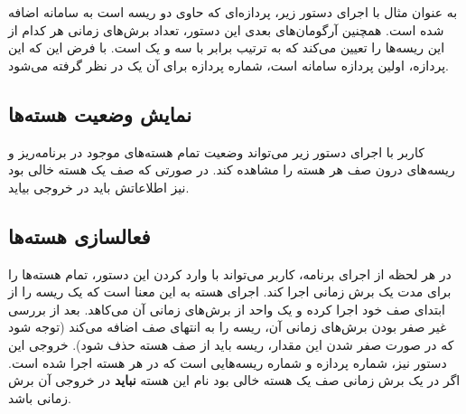\documentclass{utap}
\begin{document}
	\linespread{1.6}
	\begin{latin}%
		\centering
		\begin{minipage}[t]{1\textwidth}
			{}
			{}
		\end{minipage}%
	\end{latin}


\hspace{5mm}
به عنوان مثال با اجرای دستور زیر، پردازه‌ای که حاوی دو ریسه است به سامانه اضافه شده است. همچنین آرگومان‌های بعدی این دستور، تعداد برش‌های زمانی هر کدام از این ریسه‌ها را تعیین می‌کند که به ترتیب برابر با سه و یک است. با فرض این که این پردازه، اولین پردازه سامانه است،‌ شماره پردازه برای آن یک در نظر گرفته می‌شود.

	\linespread{1.6}
	\begin{latin}%
		\centering
		\begin{minipage}[t]{1\textwidth}
			{}
			{}
		\end{minipage}%
	\end{latin}

	\subsection{نمایش وضعیت هسته‌ها}
	\hspace{5mm}
	کاربر با اجرای دستور زیر می‌تواند وضعیت تمام هسته‌های موجود در برنامه‌ریز و ریسه‌های درون صف هر هسته را مشاهده کند. در صورتی که صف یک هسته‌ خالی بود نیز اطلاعاتش باید در خروجی بیاید.
	
	\linespread{1.6}
	\begin{latin}%
		\centering
		\begin{minipage}[t]{1\textwidth}
			{}
			{}
			{}
		\end{minipage}%
	\end{latin}

	\subsection{فعالسازی هسته‌ها}
	\hspace{5mm}
	در هر لحظه از اجرای برنامه، کاربر می‌تواند با وارد کردن این دستور، تمام هسته‌ها را برای مدت یک برش زمانی اجرا کند. اجرای هسته به این معنا است که یک ریسه‌ را از ابتدای صف خود  اجرا کرده و یک واحد از برش‌های زمانی آن می‌کاهد. بعد از بررسی غیر صفر بودن برش‌های زمانی آن، ریسه را به انتهای صف اضافه می‌کند (توجه شود که در صورت صفر شدن این مقدار،‌ ریسه باید از صف هسته حذف شود).
	خروجی این دستور نیز، شماره پردازه و شماره ریسه‌هایی است که در هر هسته اجرا شده است. اگر در یک برش زمانی صف یک هسته خالی بود نام این هسته\textbf{ نباید} در خروجی آن برش زمانی باشد.
	
\end{document}

